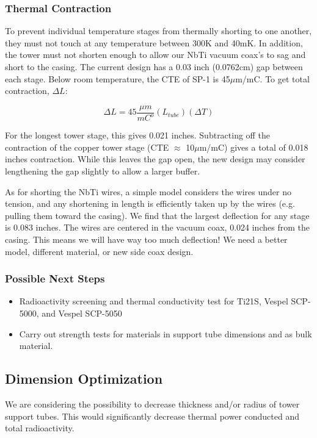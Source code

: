 \documentclass{report}
\begin{document}
\subsubsection{Thermal Contraction}


To prevent individual temperature stages from thermally shorting to one another, they must not touch at any temperature between 300K and 40mK. In addition, the tower must not shorten enough to allow our NbTi vacuum coax's to sag and short to the casing. The current design has a 0.03 inch (0.0762cm) gap between each stage. Below room temperature, the CTE of SP-1 is 45$\mu$m/mC. To get total contraction, $\Delta L$:

$$
\Delta L = 45\frac{\mu m}{mC^{o}}(L_{tube})(\Delta T)
$$

For the longest tower stage, this gives 0.021 inches. Subtracting off the contraction of the copper tower stage (CTE $\approx$ 10$\mu$m/mC) gives a total of 0.018 inches contraction. While this leaves the gap open, the new design may consider lengthening the gap slightly to allow a larger buffer.

As for shorting the NbTi wires, a simple model considers the wires under no tension, and any shortening in length is efficiently taken up by the wires (e.g. pulling them toward
the casing). We find that the largest deflection for any stage is 0.083 inches. The wires are centered in the vacuum coax, 0.024 inches from the casing. This means we will have way too much deflection! We need a better model, different material, or new side coax design.

\subsubsection{Possible Next Steps}
\begin{itemize}
\item Radioactivity screening and thermal conductivity test for Ti21S, Vespel SCP-5000, and Vespel SCP-5050
\item Carry out strength tests for materials in support tube dimensions and as bulk material.
\end{itemize}

\subsection{Dimension Optimization}
 We are considering the possibility to decrease thickness and/or radius of tower support tubes. This would significantly decrease thermal power conducted and total radioactivity.
\end{document}
